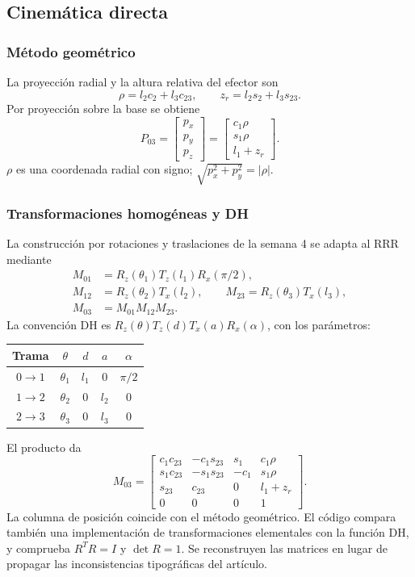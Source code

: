 \subsection{Cinemática directa}
\subsubsection{Método geométrico}
La proyección radial y la altura relativa del efector son
\begin{equation}
\rho=l_2c_2+l_3c_{23},\qquad z_r=l_2s_2+l_3s_{23}.
\end{equation}
Por proyección sobre la base se obtiene
\begin{equation}
P_{03}=\begin{bmatrix}p_x\\p_y\\p_z\end{bmatrix}=
\begin{bmatrix}c_1\rho\\s_1\rho\\l_1+z_r\end{bmatrix}.
\end{equation}
$\rho$ es una coordenada radial con signo; $\sqrt{p_x^2+p_y^2}=|\rho|$.

\subsubsection{Transformaciones homogéneas y DH}
La construcción por rotaciones y traslaciones de la semana 4 se adapta al RRR mediante \parencite{course4}
\begin{align}
M_{01}&=R_z(\theta_1)T_z(l_1)R_x(\pi/2),\\
M_{12}&=R_z(\theta_2)T_x(l_2),\qquad
M_{23}=R_z(\theta_3)T_x(l_3),\\
M_{03}&=M_{01}M_{12}M_{23}.
\end{align}
La convención DH es $R_z(\theta)T_z(d)T_x(a)R_x(\alpha)$, con los parámetros:
\begin{center}\begin{tabular}{ccccc}\toprule
Trama & $\theta$ & $d$ & $a$ & $\alpha$\\\midrule
$0\to1$ & $\theta_1$ & $l_1$ & 0 & $\pi/2$\\
$1\to2$ & $\theta_2$ & 0 & $l_2$ & 0\\
$2\to3$ & $\theta_3$ & 0 & $l_3$ & 0\\\bottomrule
\end{tabular}\end{center}
El producto da
\begin{equation}
M_{03}=\begin{bmatrix}
c_1c_{23}&-c_1s_{23}&s_1&c_1\rho\\
s_1c_{23}&-s_1s_{23}&-c_1&s_1\rho\\
s_{23}&c_{23}&0&l_1+z_r\\
0&0&0&1
\end{bmatrix}.
\end{equation}
La columna de posición coincide con el método geométrico. El código compara también una implementación de transformaciones elementales con la función DH, y comprueba $R^TR=I$ y $\det R=1$. Se reconstruyen las matrices en lugar de propagar las inconsistencias tipográficas del artículo.

